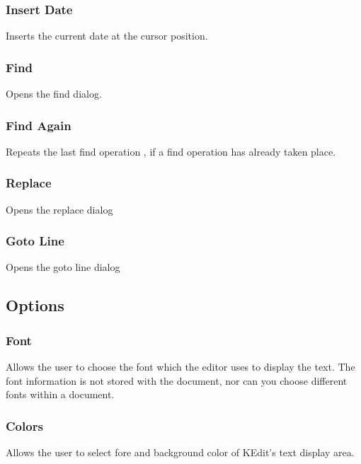 \documentclass{article}
\begin{document}
\subsubsection{Insert Date}

Inserts the current date at the cursor position.


\subsubsection{Find}

Opens the find dialog. 


\subsubsection{Find Again }

Repeats the last find operation , if a find operation has already taken place.


\subsubsection{Replace}

Opens the replace dialog


\subsubsection{Goto Line}

Opens the goto line dialog




\subsection{Options}




\subsubsection{Font}

Allows the user to choose the font which the editor uses to display the text.
The font information is not stored with the document, nor can you choose different
fonts within a document. 


\subsubsection{Colors}

Allows the user to select fore and background color of KEdit's text display area.
\end{document}
